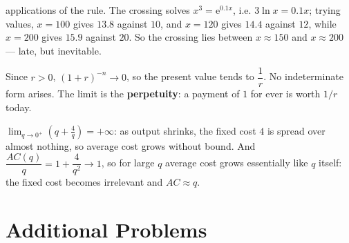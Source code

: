 \begin{solutions}
        applications of the rule. The crossing solves
        $x^{3}=\mathrm{e}^{0.1x}$, i.e. $3\ln x=0.1x$; trying values,
        $x=100$ gives $13.8$ against $10$, and $x=120$ gives $14.4$
        against $12$, while $x=200$ gives $15.9$ against $20$. So the
        crossing lies between $x\approx150$ and $x\approx200$ --- late, but
        inevitable.
  \item Since $r>0$, $(1+r)^{-n}\to0$, so the present value tends to
        $\dfrac{1}{r}$. No indeterminate form arises. The limit is the
        \textbf{perpetuity}: a payment of $1$ for ever is worth $1/r$
        today.
  \item $\displaystyle\lim_{q\to0^{+}}\left(q+\frac4q\right)=+\infty$: as
        output shrinks, the fixed cost $4$ is spread over almost nothing,
        so average cost grows without bound. And
        $\dfrac{AC(q)}{q}=1+\dfrac{4}{q^{2}}\to1$, so for large $q$ average
        cost grows essentially like $q$ itself: the fixed cost becomes
        irrelevant and $AC\approx q$.
\end{solutions}

\section{Additional Problems}


